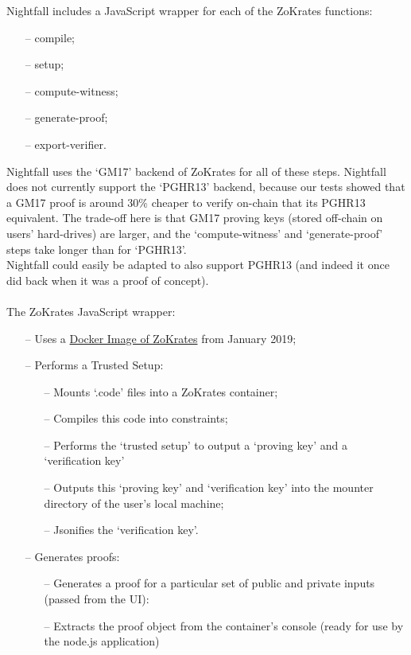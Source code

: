 \documentclass{article}
\begin{document}
Nightfall includes a JavaScript wrapper for each of the ZoKrates functions:
\begin{itemize} \itemsep-0.5em
  \item[--] compile;
  \item[--] setup;
  \item[--] compute-witness;
  \item[--] generate-proof;
  \item[--] export-verifier.
\end{itemize}

\noindent
Nightfall uses the `GM17' backend of ZoKrates for all of these steps. Nightfall does not currently support the `PGHR13' backend, because our tests showed that a GM17 proof is around 30\% cheaper to verify on-chain that its PGHR13 equivalent. The trade-off here is that GM17 proving keys (stored off-chain on users' hard-drives) are larger, and the `compute-witness' and `generate-proof' steps take longer than for `PGHR13'.\\
Nightfall could easily be adapted to also support PGHR13 (and indeed it once did back when it was a proof of concept).\\
\\
The ZoKrates JavaScript wrapper:
\begin{itemize} \itemsep-0.5em
  \item[--] Uses a \href{https://hub.docker.com/r/michaelconnor/zok}{Docker Image of ZoKrates} from January 2019;
  \item[--] Performs a Trusted Setup:
  \begin{itemize}
    \item[--] Mounts `.code' files into a ZoKrates container;
    \item[--] Compiles this code into constraints;
    \item[--] Performs the `trusted setup' to output a `proving key' and a `verification key'
    \item[--] Outputs this `proving key' and `verification key' into the mounter directory of the user's local machine;
    \item[--] Jsonifies the `verification key'.
  \end{itemize}
  \item[--] Generates proofs:
  \begin{itemize}
    \item[--] Generates a proof for a particular set of public and private inputs (passed from the UI):
    \item[--] Extracts the proof object from the container's console (ready for use by the node.js application)
  \end{itemize}
\end{itemize}
\end{document}
